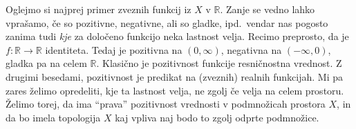 








Oglejmo si najprej primer zveznih funkcij iz \(X\) v \(ℝ\).
Zanje se vedno lahko vprašamo, če so pozitivne, negativne, ali so gladke,
ipd.~vendar nas pogosto zanima tudi \emph{kje} za določeno funkcijo neka
lastnost velja. Recimo preprosto, da je \(f : ℝ → ℝ\) identiteta. Tedaj je
pozitivna na \((0,∞)\), negativna na \((-∞,0)\), gladka pa na celem \(ℝ\).
Klasično je pozitivnost funkcije resničnostna vrednost. Z drugimi besedami,
pozitivnost je predikat na (zveznih) realnih funkcijah. Mi pa zares želimo
opredeliti, kje ta lastnost velja, ne zgolj če velja na celem prostoru.
Želimo torej, da ima ``prava'' pozitivnost vrednosti v podmnožicah prostora
\(X\), in da bo imela topologija \(X\) kaj vpliva naj bodo to zgolj odprte
podmnožice.

